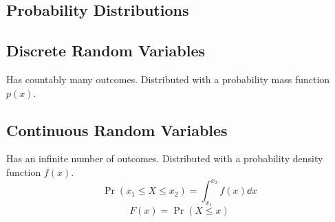 \documentclass{article}
\begin{document}
\begin{minipage}{126.1962963mm}
    \begin{multicols}{2}
        \section*{Probability Distributions}
        \subsection*{Discrete Random Variables}
        Has countably many outcomes. Distributed with a
        probability mass function \(p(x)\).
        \subsection*{Continuous Random Variables}
        Has an infinite number of outcomes. Distributed with a
        probability density function \(f(x)\).
        \begin{equation*}
            \Pr{\left( x_1 \leq X \leq x_2 \right)} = \int_{x_1}^{x_2} f(x) \dd{x}
        \end{equation*}
        \begin{equation*}
            F(x) = \Pr{\left( X \leq x \right)}
        \end{equation*}

\end{multicols}
\end{minipage}
\end{document}
